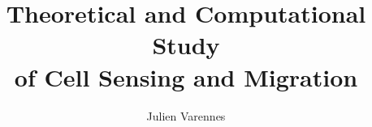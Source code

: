 \documentclass[ece,dissertation]{puthesis}
\title{Theoretical and Computational Study \\ of Cell Sensing and Migration}
\author{Julien Varennes}{Varennes, Julien}
\begin{document}
\volume













% 



% 
% 
% 
% 
% 
% 

% 
\end{document}
